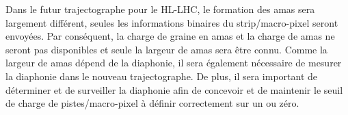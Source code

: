 
Dans le futur trajectographe pour le HL-LHC, le formation des amas sera largement différent, seules les informations binaires du strip/macro-pixel seront envoyées. Par conséquent, la charge de graine en amas et la charge de amas ne seront pas disponibles et seule la largeur de amas sera être connu. Comme la largeur de amas dépend de la diaphonie, il sera également nécessaire de mesurer la diaphonie dans le nouveau trajectographe. De plus, il sera important de déterminer et de surveiller la diaphonie afin de concevoir et de maintenir le seuil de charge de pistes/macro-pixel à définir correctement sur un ou zéro.

\vspace*{1cm}


